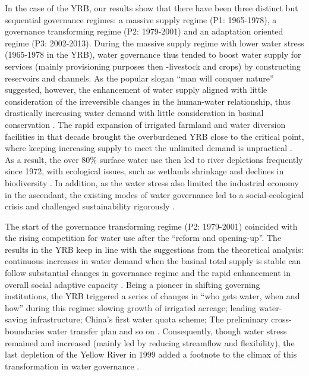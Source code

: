 In the case of the YRB, our results show that there have been three distinct but sequential governance regimes: a massive supply regime (P1: 1965-1978), a governance transforming regime (P2: 1979-2001) and an adaptation oriented regime (P3: 2002-2013).
During the massive supply regime with lower water stress (1965-1978 in the YRB), water governance thus tended to boost water supply for services (mainly provisioning purposes then -livestock and crops) by constructing reservoirs and channels.
As the popular slogan ``man will conquer nature'' suggested, however, the enhancement of water supply aligned with little consideration of the irreversible changes in the human-water relationship, thus drastically increasing water demand with little consideration in basinal conservation
\cite{zhou2020}.
The rapid expansion of irrigated farmland and water diversion facilities in that decade brought the overburdened YRB close to the critical point, where keeping increasing supply to meet the unlimited demand is unpractical \cite{loch2020}.
As a result, the over 80\% surface water use then led to river depletions frequently since 1972, with ecological issues, such as wetlands shrinkage and declines in biodiversity \cite{wang2019c}.
In addition, as the water stress also limited the industrial economy in the ascendant, the existing modes of water governance led to a social-ecological crisis and challenged sustainability rigorously
\cite{wohlfart2016a}.

The start of the governance transforming regime (P2: 1979-2001) coincided with the rising competition for water use after the ``reform and opening-up''.
The results in the YRB keep in line with the suggestions from the theoretical analysis: continuous increases in water demand when the basinal total supply is stable can follow substantial changes in governance regime and the rapid enhancement in overall social adaptive capacity \cite{loch2020}.
Being a pioneer in shifting governing institutions, the YRB triggered a series of changes in ``who gets water, when and how'' during this regime: slowing growth of irrigated acreage; leading water-saving infrastructure; China's first water quota scheme; The preliminary cross-boundaries water transfer plan and so on
\cite{wang2019a,long2020,nickum2021}.
Consequently, though water stress remained and increased (mainly led by reducing streamflow and flexibility), the last depletion of the Yellow River in 1999 added a footnote to the climax of this transformation in water governance \cite{wang2019a}.

